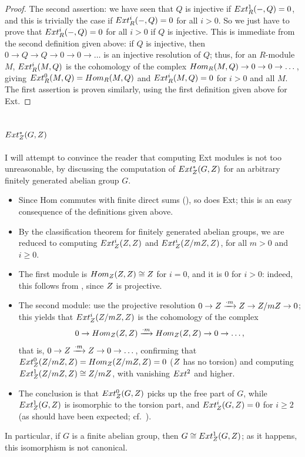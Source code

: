 \begin{proof}
  The second assertion: we have seen that $Q$ is injective if
  $Ext^1_R(-, Q) = 0$, and this is trivially the case if
  $Ext^i_R(-, Q) = 0$ for all $i > 0$. So we just have to prove that
  $Ext^i_R(-, Q) = 0$ for all $i > 0$ if $Q$ is injective. This is
  immediate from the second definition given above: if $Q$ is
  injective, then $0 \to Q \to Q \to 0 \to 0 \to \dots$ is an
  injective resolution of $Q$; thus, for an $R$-module $M$,
  $Ext^i_R(M, Q)$ is the cohomology of the complex
  $Hom_R(M,Q) \to 0 \to 0 \to \dots$, giving
  $Ext^0_R(M,Q) = Hom_R(M,Q)$ and $Ext^i_R(M,Q) = 0$ for $i > 0$
  and all $M$. The first assertion is proven similarly, using the
  first definition given above for Ext.
\end{proof}

\subsection{\texorpdfstring{$Ext^*_{Z}(G, Z)$}{Ext*\_Z(G, Z)}}
\label{subsec:linrep:ext-Z-G-Z}
I will attempt to convince the reader that computing Ext modules is
not too unreasonable, by discussing the computation of
$Ext^*_{Z}(G, Z)$ for an arbitrary finitely generated abelian group
$G$.
\begin{itemize}
\item Since Hom commutes with finite direct sums
  (), so does Ext; this is an easy
  consequence of the definitions given above.
\item By the classification theorem for finitely generated abelian
  groups, we are reduced to computing $Ext^i_{Z}(Z, Z)$ and
  $Ext^i_{Z}(Z/mZ, Z)$, for all $m > 0$ and $i \geq 0$.
\item The first module is $Hom_{Z}(Z,Z) \cong Z$ for $i = 0$, and
  it is $0$ for $i > 0$: indeed, this follows from
  , since $Z$ is projective.
\item The second module: use the projective resolution
  $0 \to Z \xrightarrow{\cdot m} Z \to Z/mZ \to 0$; this yields
  that $Ext^i_{Z}(Z/mZ, Z)$ is the cohomology of the complex
  \[
    0 \to Hom_{Z}(Z,Z) \xrightarrow{\cdot m} Hom_{Z}(Z,Z) \to
    0 \to \dots,
  \]
  that is, $0 \to Z \xrightarrow{\cdot m} Z \to 0 \to \dots$,
  confirming that
  $Ext^0_{Z}(Z/mZ, Z) = Hom_{Z}(Z/mZ, Z) = 0$ ($Z$ has no
  torsion) and computing $Ext^1_{Z}(Z/mZ, Z) \cong Z/mZ$, with
  vanishing $Ext^2$ and higher.
\item The conclusion is that $Ext^0_{Z}(G, Z)$ picks up the free
  part of $G$, while $Ext^1_{Z}(G, Z)$ is isomorphic to the torsion
  part, and $Ext^i_{Z}(G, Z) = 0$ for $i \geq 2$ (as should have
  been expected; cf.\
  ).
\end{itemize}
In particular, if $G$ is a finite abelian group, then
$G \cong Ext^1_{Z}(G, Z)$; as it happens, this isomorphism is not
canonical.

